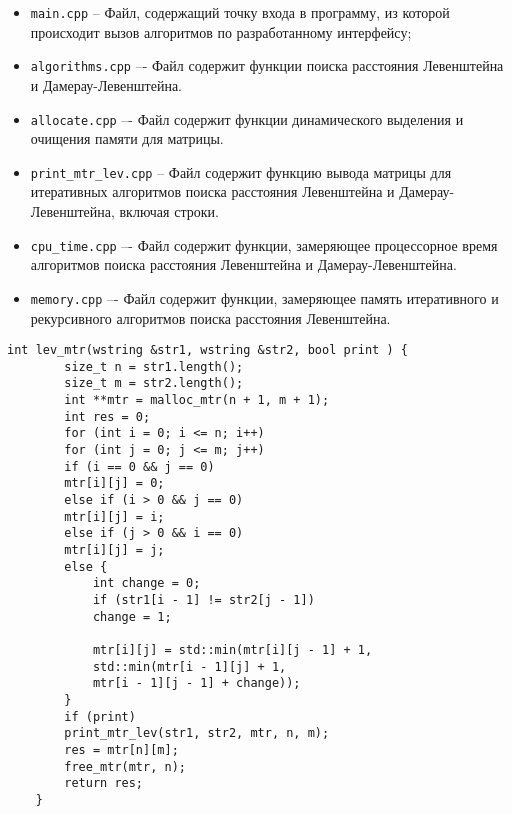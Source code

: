 \begin{itemize}
	\item \texttt{main.cpp} -- Файл, содержащий точку входа в программу, из которой происходит вызов алгоритмов по разработанному интерфейсу;
	\item \texttt{algorithms.cpp} –- Файл содержит функции поиска расстояния Левенштейна и Дамерау-Левенштейна.
	\item \texttt{allocate.cpp} –- Файл содержит функции динамического выделения и очищения памяти для матрицы.
	\item \texttt{print\_mtr\_lev.cpp} -- Файл содержит функцию вывода матрицы для итеративных алгоритмов поиска расстояния Левенштейна и Дамерау-Левенштейна, включая строки.
	\item \texttt{cpu\_time.cpp} –- Файл содержит функции, замеряющее процессорное время алгоритмов поиска расстояния Левенштейна и Дамерау-Левенштейна.
	\item \texttt{memory.cpp} –- Файл содержит функции, замеряющее память итеративного и рекурсивного алгоритмов поиска расстояния Левенштейна.
\end{itemize}

\begin{lstlisting}[label=lst:lev_mtr,caption=Функция нахождения расстояния Левенштейна с использованием матрицы]
	int lev_mtr(wstring &str1, wstring &str2, bool print ) {
		size_t n = str1.length();
		size_t m = str2.length();
		int **mtr = malloc_mtr(n + 1, m + 1);
		int res = 0;
		for (int i = 0; i <= n; i++)
		for (int j = 0; j <= m; j++)
		if (i == 0 && j == 0)
		mtr[i][j] = 0;
		else if (i > 0 && j == 0)
		mtr[i][j] = i;
		else if (j > 0 && i == 0)
		mtr[i][j] = j;
		else {
			int change = 0;
			if (str1[i - 1] != str2[j - 1])
			change = 1;
			
			mtr[i][j] = std::min(mtr[i][j - 1] + 1,
			std::min(mtr[i - 1][j] + 1,
			mtr[i - 1][j - 1] + change));
		}
		if (print)
		print_mtr_lev(str1, str2, mtr, n, m);
		res = mtr[n][m];
		free_mtr(mtr, n);
		return res;
	}
\end{lstlisting}

\clearpage

